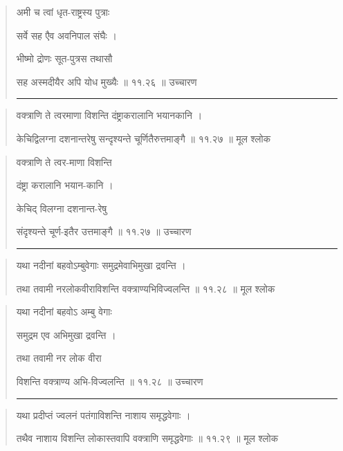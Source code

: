 \begin{quotation}

अमी च त्वां धृत-राष्ट्रस्य पुत्राः

सर्वे सह एैव अवनिपाल संघैः  ।  

भीष्मो द्रोणः सूत-पुत्रस तथासौ

सह अस्मदीयैर अपि योध मुख्यैः  ॥ ११.२६ ॥  उच्चारण

\noindent\rule{16cm}{0.4pt} 
\end{quotation}


\begin{quotation} 

वक्त्राणि ते त्वरमाणा विशन्ति दंष्ट्राकरालानि भयानकानि  ।  

केचिद्विलग्ना दशनान्तरेषु सन्दृश्यन्ते चूर्णितैरुत्तमाङ्‍गै  ॥ ११.२७ ॥  मूल श्लोक
\end{quotation}

\begin{quotation}

वक्त्राणि ते त्वर-माणा विशन्ति

दंष्ट्रा करालानि भयान-कानि  ।  

केचिद् विलग्ना दशनान्त-रेषु 

संदृश्यन्ते चूर्ण-इतैर उत्तमाङ्‍गै  ॥ ११.२७ ॥  उच्चारण

\noindent\rule{16cm}{0.4pt} 
\end{quotation}


\begin{quotation} 

यथा नदीनां बहवोऽम्बुवेगाः समुद्रमेवाभिमुखा द्रवन्ति  ।  

तथा तवामी नरलोकवीराविशन्ति वक्त्राण्यभिविज्वलन्ति  ॥ ११.२८ ॥  मूल श्लोक
\end{quotation}

\begin{quotation}




यथा नदीनां बहवोऽ अम्बु वेगाः

समुद्रम एव अभिमुखा द्रवन्ति  ।  

तथा तवामी नर लोक वीरा

विशन्ति वक्त्राण्य अभि-विज्वलन्ति  ॥ ११.२८ ॥  उच्चारण

\noindent\rule{16cm}{0.4pt} 
\end{quotation}


\begin{quotation} 

यथा प्रदीप्तं ज्वलनं पतंगाविशन्ति नाशाय समृद्धवेगाः  ।  

तथैव नाशाय विशन्ति लोकास्तवापि वक्त्राणि समृद्धवेगाः  ॥ ११.२९ ॥  मूल श्लोक
\end{quotation}

